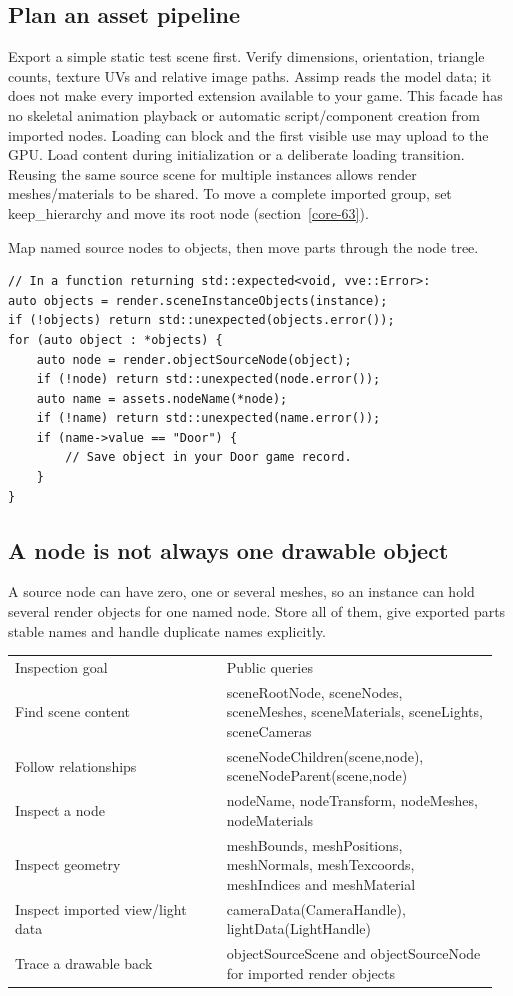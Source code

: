 \documentclass[11pt,a4paper]{article}
\begin{document}
\subsection*{Plan an asset pipeline}
Export a simple static test scene first. Verify dimensions, orientation, triangle counts, texture UVs and relative image paths. Assimp reads the model data; it does not make every imported extension available to your game. This facade has no skeletal animation playback or automatic script/component creation from imported nodes. Loading can block and the first visible use may upload to the GPU. Load content during initialization or a deliberate loading transition. Reusing the same source scene for multiple instances allows render meshes/materials to be shared. To move a complete imported group, set keep\_hierarchy and move its root node (section~\ref{core-63}).

\label{core-63}
Map named source nodes to objects, then move parts through the node tree.

\begin{lstlisting}[language={}]
// In a function returning std::expected<void, vve::Error>:
auto objects = render.sceneInstanceObjects(instance);
if (!objects) return std::unexpected(objects.error());
for (auto object : *objects) {
    auto node = render.objectSourceNode(object);
    if (!node) return std::unexpected(node.error());
    auto name = assets.nodeName(*node);
    if (!name) return std::unexpected(name.error());
    if (name->value == "Door") {
        // Save object in your Door game record.
    }
}
\end{lstlisting}

\subsection*{A node is not always one drawable object}
A source node can have zero, one or several meshes, so an instance can hold several render objects for one named node. Store all of them, give exported parts stable names and handle duplicate names explicitly.

{\small
\begin{longtable}{@{}p{0.42\linewidth}p{0.54\linewidth}@{}}
Inspection goal & Public queries \\
Find scene content & sceneRootNode, sceneNodes, sceneMeshes, sceneMaterials, sceneLights, sceneCameras \\
Follow relationships & sceneNodeChildren(scene,node), sceneNodeParent(scene,node) \\
Inspect a node & nodeName, nodeTransform, nodeMeshes, nodeMaterials \\
Inspect geometry & meshBounds, meshPositions, meshNormals, meshTexcoords, meshIndices and meshMaterial \\
Inspect imported view/light data & cameraData(CameraHandle), lightData(LightHandle) \\
Trace a drawable back & objectSourceScene and objectSourceNode for imported render objects \\
\end{longtable}
}
\end{document}
